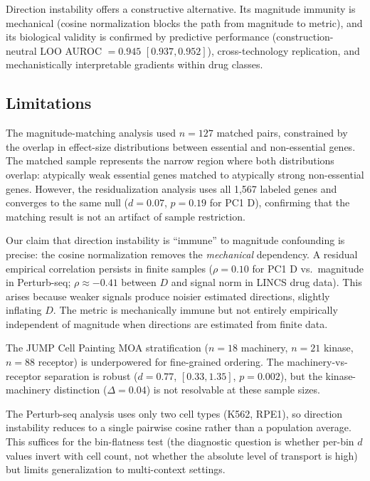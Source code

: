 \documentclass[11pt]{article}
\begin{document}
Direction instability offers a constructive alternative. Its magnitude
immunity is mechanical (cosine normalization blocks the path from
magnitude to metric), and its biological validity is confirmed by
predictive performance (construction-neutral LOO AUROC $= 0.945$
$[0.937, 0.952]$), cross-technology replication, and mechanistically
interpretable gradients within drug classes.

\subsection{Limitations}

The magnitude-matching analysis used $n = 127$ matched pairs,
constrained by the overlap in effect-size distributions between
essential and non-essential genes. The matched sample represents the
narrow region where both distributions overlap: atypically weak essential
genes matched to atypically strong non-essential genes. However, the
residualization analysis uses all 1{,}567 labeled genes and converges to
the same null ($d = 0.07$, $p = 0.19$ for PC1 D), confirming that the
matching result is not an artifact of sample restriction.

Our claim that direction instability is ``immune'' to magnitude
confounding is precise: the cosine normalization removes the
\emph{mechanical} dependency. A residual empirical correlation persists
in finite samples ($\rho = 0.10$ for PC1 D vs.\ magnitude in
Perturb-seq; $\rho \approx -0.41$ between $D$ and signal norm in LINCS
drug data). This arises because weaker signals produce noisier estimated
directions, slightly inflating $D$. The metric is mechanically immune but
not entirely empirically independent of magnitude when directions are
estimated from finite data.

The JUMP Cell Painting MOA stratification ($n = 18$ machinery, $n = 21$
kinase, $n = 88$ receptor) is underpowered for fine-grained ordering.
The machinery-vs-receptor separation is robust ($d = 0.77$, $[0.33,
1.35]$, $p = 0.002$), but the kinase-machinery distinction ($\Delta =
0.04$) is not
resolvable at these sample sizes.

The Perturb-seq analysis uses only two cell types (K562, RPE1), so
direction instability reduces to a single pairwise cosine rather than
a population average. This suffices for the bin-flatness test (the
diagnostic question is whether per-bin $d$ values invert with cell
count, not whether the absolute level of transport is high) but limits
generalization to multi-context settings.
\end{document}
